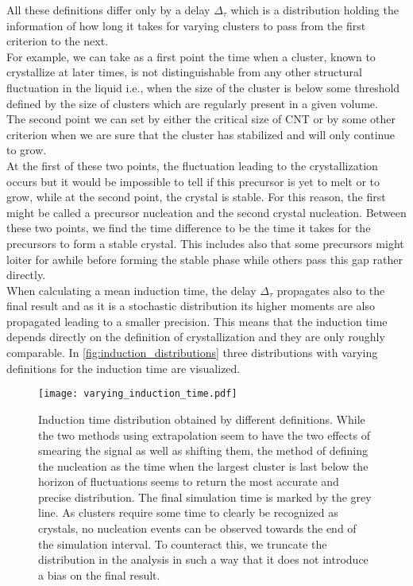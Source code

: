 All these definitions differ only by a delay $\Delta_{\tau}$ which is a distribution holding the information of how long it takes for varying clusters to pass from the first criterion to the next.\\
For example, we can take as a first point the time when a cluster, known to crystallize at later times, is not distinguishable from any other structural fluctuation in the liquid i.e., when the size of the cluster is below some threshold defined by the size of clusters which are regularly present in a given volume.\\
The second point we can set by either the critical size of CNT or by some other criterion when we are sure that the cluster has stabilized and will only continue to grow.\\
At the first of these two points, the fluctuation leading to the crystallization occurs but it would be impossible to tell if this precursor is yet to melt or to grow, while at the second point, the crystal is stable. For this reason, the first might be called a precursor nucleation and the second crystal nucleation. Between these two points, we find the time difference to be the time it takes for the precursors to form a stable crystal. This includes also that some precursors might loiter for awhile before forming the stable phase while others pass this gap rather directly.\\

When calculating a mean induction time, the delay $\Delta_{\tau}$ propagates also to the final result and as it is a stochastic distribution its higher moments are also propagated leading to a smaller precision. This means that the induction time depends directly on the definition of crystallization and they are only roughly comparable. In \autoref{fig:induction_distributions} three distributions with varying definitions for the induction time are visualized.

\begin{figure}[!h]
\centering
\texttt{[image: varying\_induction\_time.pdf]}
\caption[Comparison of different definitions for the induction time]{Induction time distribution obtained by different definitions. While the two methods using extrapolation seem to have the two effects of smearing the signal as well as shifting them, the method of defining the nucleation as the time when the largest cluster is last below the horizon of fluctuations seems to return the most accurate and precise distribution. The final simulation time is marked by the grey line. As clusters require some time to clearly be recognized as crystals, no nucleation events can be observed towards the end of the simulation interval. To counteract this, we truncate the distribution in the analysis in such a way that it does not introduce a bias on the final result.}
\label{fig:induction_distributions}
\end{figure}

